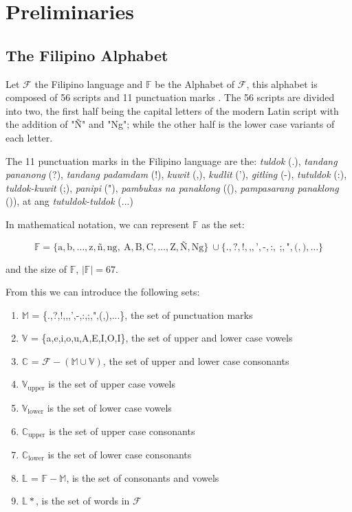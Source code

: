 \section{Preliminaries}
\subsection{The Filipino Alphabet}

Let \(\mathcal{F}\) the Filipino language
and \(\mathbb{F}\) be the Alphabet of \(\mathcal{F}\), this alphabet is
composed of 56 scripts and 11 punctuation marks \cite{OOP}. The 56 scripts are divided into
two, the first half being the capital letters of the modern Latin script with
the addition of "Ñ" and "Ng"; while the other half is the lower case variants
of each letter.

The 11 punctuation marks in the Filipino language are the: \textit{tuldok} (.),
\textit{tandang pananong} (?), \textit{tandang padamdam} (!), \textit{kuwit} (,),
\textit{kudlit} ('), \textit{gitling} (-), \textit{tutuldok} (:),
\textit{tuldok-kuwit} (;), \textit{panipi} ("), \textit{pambukas na panaklong}
((), \textit{pampasarang panaklong} ()), at ang \textit{tutuldok-tuldok} (...)

In mathematical notation, we can represent \(\mathbb{F}\) as the set:

\[
    \mathbb{F} = \{\text{a},\text{b},\dots,\text{z},\text{ñ},\text{ng},   \
    \text{A},\text{B},\text{C},\dots,\text{Z},\text{Ñ},\text{Ng}\}         \
    \cup \{\text{.},\text{?},\text{!},\text{,},\text{'},\text{-},\text{:}, \
    \text{;},\text{"},\text{(},\text{)}, \ldots\}
\]

and the size of \(\mathbb{F}\), \(\left|\mathbb{F}\right| = 67\).

From this we can introduce the following sets:
\begin{enumerate}
    \item \(\mathbb{M}\) = \{.,?,!,,,',-,:,;,",(,),...\}, the set of punctuation marks
    \item \(\mathbb{V}\) = \{a,e,i,o,u,A,E,I,O,I\}, the set of upper and lower case vowels
    \item \(\mathbb{C}\) = \(\mathcal{F} - (\mathbb{M}\cup\mathbb{V})\),
          the set of upper and lower case consonants
    \item \(\mathbb{V}_\text{upper}\) is the set of upper case vowels
    \item \(\mathbb{V}_\text{lower}\) is the set of lower case vowels
    \item \(\mathbb{C}_\text{upper}\) is the set of upper case consonants
    \item \(\mathbb{C}_\text{lower}\) is the set of lower case consonants
    \item \(\mathbb{L}\) = \(\mathbb{F} - \mathbb{M}\), is the set of consonants and vowels
    \item \(\mathbb{L}*\), is the set of words in \(\mathcal{F}\)
\end{enumerate}

